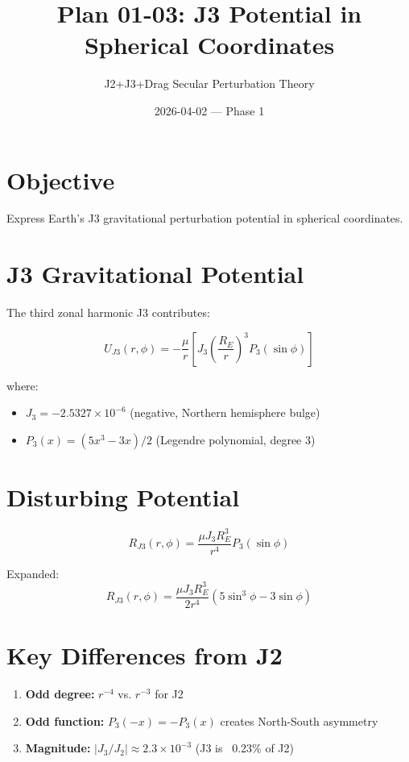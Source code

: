 \documentclass[11pt]{article}
\title{Plan 01-03: J3 Potential in Spherical Coordinates}
\author{J2+J3+Drag Secular Perturbation Theory}
\date{2026-04-02 — Phase 1}
\begin{document}
\maketitle

\section{Objective}
Express Earth's J3 gravitational perturbation potential in spherical coordinates.

\section{J3 Gravitational Potential}

The third zonal harmonic J3 contributes:

\begin{equation}
U_{J3}(r, \phi) = -\frac{\mu}{r}\left[J_3\left(\frac{R_E}{r}\right)^3 P_3(\sin \phi)\right]
\end{equation}

where:
\begin{itemize}
    \item $J_3 = -2.5327 \times 10^{-6}$ (negative, Northern hemisphere bulge)
    \item $P_3(x) = (5x^3 - 3x)/2$ (Legendre polynomial, degree 3)
\end{itemize}

\section{Disturbing Potential}

\begin{equation}
\boxed{R_{J3}(r, \phi) = \frac{\mu J_3 R_E^3}{r^4} P_3(\sin \phi)}
\label{eq:rj3}
\end{equation}

Expanded:
\begin{equation}
R_{J3}(r, \phi) = \frac{\mu J_3 R_E^3}{2r^4}\left(5\sin^3 \phi - 3\sin \phi\right)
\end{equation}

\section{Key Differences from J2}

\begin{enumerate}
    \item \textbf{Odd degree:} $r^{-4}$ vs. $r^{-3}$ for J2
    \item \textbf{Odd function:} $P_3(-x) = -P_3(x)$ creates North-South asymmetry
    \item \textbf{Magnitude:} $|J_3/J_2| \approx 2.3 \times 10^{-3}$ (J3 is ~0.23\% of J2)
\end{enumerate}
\end{document}
